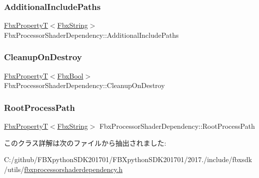 \subsubsection{\texorpdfstring{Additional\+Include\+Paths}{AdditionalIncludePaths}}
{\footnotesize\ttfamily \hyperlink{class_fbx_property_t}{Fbx\+PropertyT}$<$\hyperlink{class_fbx_string}{Fbx\+String}$>$ Fbx\+Processor\+Shader\+Dependency\+::\+Additional\+Include\+Paths}

\mbox{\label{class_fbx_processor_shader_dependency_af0bbb628b8b548365fd7d4325f1d4589}} 
\subsubsection{\texorpdfstring{Cleanup\+On\+Destroy}{CleanupOnDestroy}}
{\footnotesize\ttfamily \hyperlink{class_fbx_property_t}{Fbx\+PropertyT}$<$\hyperlink{fbxtypes_8h_a92e0562b2fe33e76a242f498b362262e}{Fbx\+Bool}$>$ Fbx\+Processor\+Shader\+Dependency\+::\+Cleanup\+On\+Destroy}

\mbox{\label{class_fbx_processor_shader_dependency_a2609315b13014fbba8003185c2e8a5f1}} 
\subsubsection{\texorpdfstring{Root\+Process\+Path}{RootProcessPath}}
{\footnotesize\ttfamily \hyperlink{class_fbx_property_t}{Fbx\+PropertyT}$<$\hyperlink{class_fbx_string}{Fbx\+String}$>$ Fbx\+Processor\+Shader\+Dependency\+::\+Root\+Process\+Path}



このクラス詳解は次のファイルから抽出されました\+:\begin{DoxyCompactItemize}
\item 
C\+:/github/\+F\+B\+Xpython\+S\+D\+K201701/\+F\+B\+Xpython\+S\+D\+K201701/2017./include/fbxsdk/utils/\hyperlink{fbxprocessorshaderdependency_8h}{fbxprocessorshaderdependency.\+h}\end{DoxyCompactItemize}
